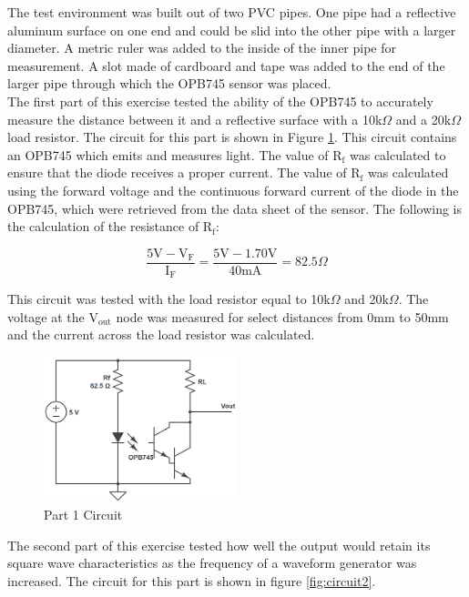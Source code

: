 \documentclass[CMPE]{KGCOEReport}
\begin{document}
The test environment was built out of two PVC pipes. One pipe had a reflective aluminum surface on one end and could be slid into the other pipe with a larger diameter. A metric ruler was added to the inside of the inner pipe for measurement. A slot made of cardboard and tape was added to the end of the larger pipe through which the OPB745 sensor was placed.\\

The first part of this exercise tested the ability of the OPB745 to accurately measure the distance between it and a reflective surface with a 10k$\Omega$ and a 20k$\Omega$ load resistor. The circuit for this part is shown in Figure \ref{fig:circuit1}. This circuit contains an OPB745 which emits and measures light. The value of R$_\text{f}$ was calculated to ensure that the diode receives a proper current. The value of R$_\text{f}$ was calculated using the forward voltage and the continuous forward current of the diode in the OPB745, which were retrieved from the data sheet of the sensor. The following is the calculation of the resistance of R$_\text{f}$:

\[ \frac{5\text{V} - \text{V}_\text{F}}{\text{I}_\text{F}} = \frac{5\text{V} - 1.70\text{V}}{40 \text{mA}} = 82.5 \Omega \]

This circuit was tested with the load resistor equal to 10k$\Omega$ and 20k$\Omega$. The voltage at the V$_{\text{out}}$ node was measured for select distances from 0mm to 50mm and the current across the load resistor was calculated.

\begin{figure}[H]
    \centering
    \includegraphics[width=0.5\textwidth]{circuit_1.png}
    \caption{Part 1 Circuit}
    \label{fig:circuit1}
\end{figure}

The second part of this exercise tested how well the output would retain its square wave characteristics as the frequency of a waveform generator was increased. The circuit for this part is shown in figure \ref{fig:circuit2}.
\end{document}
